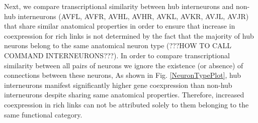 \documentclass[10pt,letterpaper]{article}
\newlength\savedwidth
\newcommand\thickhline{\noalign{\global\savedwidth\arrayrulewidth\global\arrayrulewidth 2pt}%
\hline
\noalign{\global\arrayrulewidth\savedwidth}}
\begin{document}


Next, we compare transcriptional similarity between hub interneurons and non-hub interneurons (AVFL, AVFR, AVHL, AVHR, AVKL, AVKR, AVJL, AVJR) that share similar anatomical properties in order to ensure that increase in coexpression for rich links is not determined by the fact that the majority of hub neurons belong to the same anatomical neuron type (???HOW TO CALL COMMAND INTERNEURONS???). 
In order to compare transcriptional similarity between all pairs of neurons we ignore the existence (or absence) of connections between these neurons, 
As shown in Fig. \ref{NeuronTypePlot}, hub interneurons manifest significantly higher gene coexpression than non-hub interneurons despite sharing same anatomical properties. 
Therefore, increased coexpression in rich links can not be attributed solely to them belonging to the same functional category.  



\end{document}

